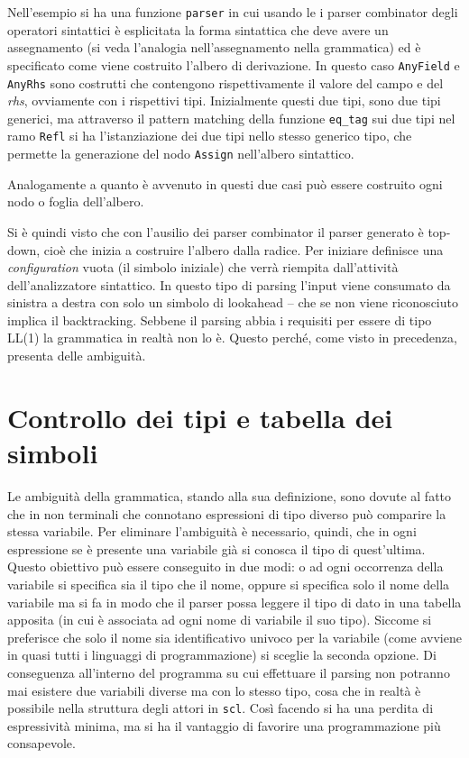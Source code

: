 \documentclass[12pt,a4paper]{report}
\begin{document}
Nell'esempio si ha una funzione \texttt{parser} in cui usando le i
parser combinator degli operatori sintattici è esplicitata la forma
sintattica che deve avere un assegnamento (si veda l'analogia
nell'assegnamento nella grammatica) ed è specificato come viene
costruito l'albero di derivazione. In questo caso \texttt{AnyField} e
\texttt{AnyRhs} sono costrutti che contengono rispettivamente il valore
del campo e del \emph{rhs}, ovviamente con i rispettivi tipi.
Inizialmente questi due tipi, sono due tipi generici, ma attraverso il
pattern matching della funzione \texttt{eq\_tag} sui due tipi nel ramo
\texttt{Refl} si ha l'istanziazione dei due tipi nello stesso generico
tipo, che permette la generazione del nodo \texttt{Assign} nell'albero
sintattico.

Analogamente a quanto è avvenuto in questi due casi può essere costruito
ogni nodo o foglia dell'albero.

Si è quindi visto che con l'ausilio dei parser combinator il parser
generato è top-down, cioè che inizia a costruire l'albero dalla radice.
Per iniziare definisce una \emph{configuration} vuota (il simbolo
iniziale) che verrà riempita dall'attività dell'analizzatore sintattico.
In questo tipo di parsing l'input viene consumato da sinistra a destra
con solo un simbolo di lookahead -- che se non viene riconosciuto
implica il backtracking. Sebbene il parsing abbia i requisiti per essere
di tipo LL(1) la grammatica in realtà non lo è. Questo perché, come
visto in precedenza, presenta delle ambiguità.

\hypertarget{controllo-dei-tipi-e-tabella-dei-simboli}{%
\section{Controllo dei tipi e tabella dei
simboli}\label{controllo-dei-tipi-e-tabella-dei-simboli}}

Le ambiguità della grammatica, stando alla sua definizione, sono dovute
al fatto che in non terminali che connotano espressioni di tipo diverso
può comparire la stessa variabile. Per eliminare l'ambiguità è
necessario, quindi, che in ogni espressione se è presente una variabile
già si conosca il tipo di quest'ultima. Questo obiettivo può essere
conseguito in due modi: o ad ogni occorrenza della variabile si
specifica sia il tipo che il nome, oppure si specifica solo il nome
della variabile ma si fa in modo che il parser possa leggere il tipo di
dato in una tabella apposita (in cui è associata ad ogni nome di
variabile il suo tipo). Siccome si preferisce che solo il nome sia
identificativo univoco per la variabile (come avviene in quasi tutti i
linguaggi di programmazione) si sceglie la seconda opzione. Di
conseguenza all'interno del programma su cui effettuare il parsing non
potranno mai esistere due variabili diverse ma con lo stesso tipo, cosa
che in realtà è possibile nella struttura degli attori in \texttt{scl}.
Così facendo si ha una perdita di espressività minima, ma si ha il
vantaggio di favorire una programmazione più consapevole.
\end{document}
